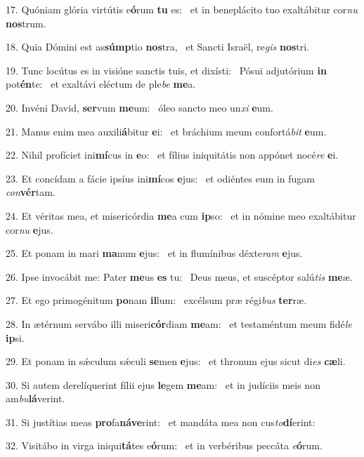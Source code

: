 17. Quóniam glória virtútis e\textbf{ó}rum \textbf{tu} es: \ast\  et in beneplácito tuo exaltábitur cor\textit{nu} \textbf{nos}trum.\

18. Quia Dómini est as\textbf{súmp}tio \textbf{nos}tra, \ast\  et Sancti Israël, re\textit{gis} \textbf{nos}tri.\

19. Tunc locútus es in visióne sanctis tuis, et dixísti: \dag\  Pósui adjutórium \textbf{in} pot\textbf{én}te: \ast\  et exaltávi eléctum de ple\textit{be} \textbf{me}a.\

20. Invéni David, \textbf{ser}vum \textbf{me}um: \ast\  óleo sancto meo un\textit{xi} \textbf{e}um.\

21. Manus enim mea auxili\textbf{á}bitur \textbf{e}i: \ast\  et bráchium meum confortá\textit{bit} \textbf{e}um.\

22. Nihil profíciet ini\textbf{mí}cus in \textbf{e}o: \ast\  et fílius iniquitátis non appónet nocé\textit{re} \textbf{e}i.\

23. Et concídam a fácie ipsíus ini\textbf{mí}cos \textbf{e}jus: \ast\  et odiéntes eum in fugam \textit{con}\textbf{vér}tam.\

24. Et véritas mea, et misericórdia \textbf{me}a cum \textbf{ip}so: \ast\  et in nómine meo exaltábitur cor\textit{nu} \textbf{e}jus.\

25. Et ponam in mari \textbf{ma}num \textbf{e}jus: \ast\  et in flumínibus déxte\textit{ram} \textbf{e}jus.\

26. Ipse invocábit me: Pater \textbf{me}us \textbf{es} tu: \ast\  Deus meus, et suscéptor salú\textit{tis} \textbf{me}æ.\

27. Et ego primogénitum \textbf{po}nam \textbf{il}lum: \ast\  excélsum præ régi\textit{bus} \textbf{ter}ræ.\

28. In ætérnum servábo illi miseri\textbf{cór}diam \textbf{me}am: \ast\  et testaméntum meum fidé\textit{le} \textbf{ip}si.\

29. Et ponam in sǽculum sǽculi \textbf{se}men \textbf{e}jus: \ast\  et thronum ejus sicut di\textit{es} \textbf{cæ}li.\

30. Si autem derelíquerint fílii ejus \textbf{le}gem \textbf{me}am: \ast\  et in judíciis meis non am\textit{bu}\textbf{lá}verint.\

31. Si justítias meas \textbf{pro}fa\textbf{ná}\textbf{ve}rint: \ast\  et mandáta mea non cus\textit{to}\textbf{dí}erint:\

32. Visitábo in virga iniqui\textbf{tá}tes e\textbf{ó}rum: \ast\  et in verbéribus peccáta \textit{e}\textbf{ó}rum.\

